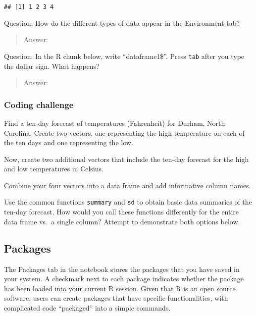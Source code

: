 \documentclass[]{article}
\newenvironment{Shaded}{\begin{snugshade}}{\end{snugshade}}
\newcommand{\NormalTok}[1]{#1}
\newcommand{\OperatorTok}[1]{\textcolor[rgb]{0.81,0.36,0.00}{\textbf{#1}}}
\begin{document}
\begin{Shaded}
\end{Shaded}

\begin{verbatim}
## [1] 1 2 3 4
\end{verbatim}

Question: How do the different types of data appear in the Environment
tab?

\begin{quote}
Answer:
\end{quote}

Question: In the R chunk below, write ``dataframe1\$''. Press
\texttt{tab} after you type the dollar sign. What happens?

\begin{quote}
Answer:
\end{quote}

\hypertarget{coding-challenge}{%
\subsubsection{Coding challenge}\label{coding-challenge}}

Find a ten-day forecast of temperatures (Fahrenheit) for Durham, North
Carolina. Create two vectors, one representing the high temperature on
each of the ten days and one representing the low.

Now, create two additional vectors that include the ten-day forecast for
the high and low temperatures in Celsius.

Combine your four vectors into a data frame and add informative column
names.

Use the common functions \texttt{summary} and \texttt{sd} to obtain
basic data summaries of the ten-day forecast. How would you call these
functions differently for the entire data frame vs.~a single column?
Attempt to demonstrate both options below.

\hypertarget{packages}{%
\subsection{Packages}\label{packages}}

The Packages tab in the notebook stores the packages that you have saved
in your system. A checkmark next to each package indicates whether the
package has been loaded into your current R session. Given that R is an
open source software, users can create packages that have specific
functionalities, with complicated code ``packaged'' into a simple
commands.
\end{document}
